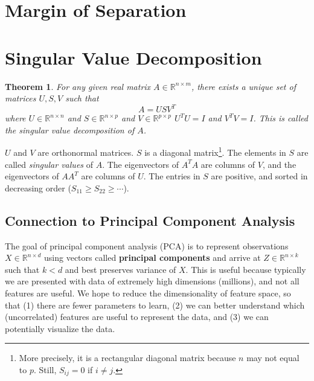 \documentclass[12pt]{article}
\title{}
\newtheorem{theorem}{Theorem}[section]
\theoremstyle{definition}
\begin{document}
\pagestyle{fancy}
\fancyhf{} %
\cfoot{\thepage}
\renewcommand{\headrulewidth}{1pt}

\section{Margin of Separation}


\section{Singular Value Decomposition}
\begin{theorem}
  For any given real matrix $A\in\mathbb{R}^{n\times m}$, there exists a unique set of matrices $U, S, V$ such that
  \begin{equation}
    A = USV^T
  \end{equation}
  where $U\in\mathbb{R}^{n\times n}$ and $S\in\mathbb{R}^{n\times p}$ and $V\in\mathbb{R}^{p\times p}$ $U^TU=I$ and $V^TV=I$. This is called the \emph{singular value decomposition} of $A$.
\end{theorem}
$U$ and $V$ are orthonormal matrices. $S$ is a diagonal matrix\footnote{More precisely, it is a rectangular diagonal matrix because $n$ may not equal to $p$. Still, $S_{ij}=0$ if $i\neq j$.}. The elements in $S$ are called \emph{singular values} of $A$. The eigenvectors of $A^TA$ are columns of $V$, and the eigenvectors of $AA^T$ are columns of $U$. The entries in $S$ are positive, and sorted in decreasing order ($S_{11}\geq S_{22}\geq\cdots$).


\subsection{Connection to Principal Component Analysis}

The goal of principal component analysis (PCA) is to represent observations $X\in\mathbb{R}^{n\times d}$ using vectors called \textbf{principal components} and arrive at $Z\in\mathbb{R}^{n\times k}$ such that $k<d$ and best preserves variance of $X$.
This is useful because typically we are presented with data of extremely high dimensions (millions), and not all features are useful. We hope to reduce the dimensionality of feature space, so that (1) there are fewer parameters to learn, (2) we can better understand which (uncorrelated) features are useful to represent the data, and (3) we can potentially visualize the data.



\end{document}
